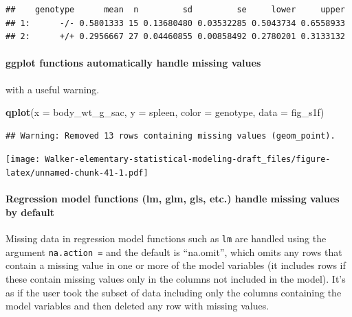 \documentclass[]{book}
\newenvironment{Shaded}{\begin{snugshade}}{\end{snugshade}}
\newcommand{\DataTypeTok}[1]{\textcolor[rgb]{0.13,0.29,0.53}{#1}}
\newcommand{\KeywordTok}[1]{\textcolor[rgb]{0.13,0.29,0.53}{\textbf{#1}}}
\newcommand{\NormalTok}[1]{#1}
\let\oldparagraph\paragraph
\renewcommand{\paragraph}[1]{\oldparagraph{#1}\mbox{}}
\begin{document}
\begin{verbatim}
##    genotype      mean  n         sd         se     lower     upper
## 1:      -/- 0.5801333 15 0.13680480 0.03532285 0.5043734 0.6558933
## 2:      +/+ 0.2956667 27 0.04460855 0.00858492 0.2780201 0.3133132
\end{verbatim}

\hypertarget{ggplot-functions-automatically-handle-missing-values}{%
\paragraph{ggplot functions automatically handle missing values}\label{ggplot-functions-automatically-handle-missing-values}}

with a useful warning.

\begin{Shaded}
\begin{Highlighting}[]
\KeywordTok{qplot}\NormalTok{(}\DataTypeTok{x =}\NormalTok{ body_wt_g_sac,}
      \DataTypeTok{y =}\NormalTok{ spleen,}
      \DataTypeTok{color =}\NormalTok{ genotype,}
      \DataTypeTok{data =}\NormalTok{ fig_s1f)}
\end{Highlighting}
\end{Shaded}

\begin{verbatim}
## Warning: Removed 13 rows containing missing values (geom_point).
\end{verbatim}

\texttt{[image: Walker-elementary-statistical-modeling-draft\_files/figure-latex/unnamed-chunk-41-1.pdf]}

\hypertarget{regression-model-functions-lm-glm-gls-etc.-handle-missing-values-by-default}{%
\paragraph{Regression model functions (lm, glm, gls, etc.) handle missing values by default}\label{regression-model-functions-lm-glm-gls-etc.-handle-missing-values-by-default}}

Missing data in regression model functions such as \texttt{lm} are handled using the argument \texttt{na.action\ =} and the default is ``na.omit'', which omits any rows that contain a missing value in one or more of the model variables (it includes rows if these contain missing values only in the columns not included in the model). It's as if the user took the subset of data including only the columns containing the model variables and then deleted any row with missing values.
\end{document}
